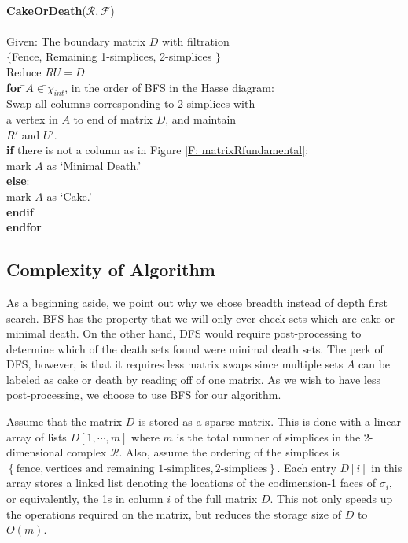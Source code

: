 \documentclass[10pt,twocolumn]{article} \usepackage{amsmath,epsf,amssymb,cite,pifont,amsthm, mathrsfs,epsfig,  bbm, amsthm,  setspace}
\newcommand{\RR}{\mathcal R}
\renewcommand{\1}{\mathbbm{1}}
\newcommand{\RF}{\mathcal{R},\mathcal{F}}
\begin{document}
\begin{tabbing}
\\
\textbf{CakeOrDeath}($\RF$)\\
\\
Given: \= The boundary matrix $D$ with filtration \\
\> $\{$Fence, Remaining 1-simplices, 2-simplices $\}$ \\
Reduce $RU=D$\\
\textbf{for} \=$A \in$\=$ \chi_{int}$,  in the order of BFS in the Hasse diagram:\\
\>	Swap all columns corresponding to 2-simplices with\\
\>\>		a vertex in $A$ to end of matrix $D$, and maintain\\
\>\>		$R'$ and $U'$.\\
\>	\textbf{if} there is not a column as in Figure \ref{F: matrixRfundamental}:\\
\>\>		mark $A$ as `Minimal Death.'\\
\>	\textbf{else}:\\
\>\>		mark $A$ as `Cake.'\\
\>	\textbf{endif}\\
\textbf{endfor}
\end{tabbing}


\subsection{Complexity of Algorithm} \label{S: Complexity of Algorithm}
As a beginning aside, we point out why we chose breadth instead of depth first search.
BFS has the property that we will only ever check sets which are cake or minimal death.
On the other hand, DFS would require post-processing to determine which of the death sets  found were minimal death sets.
The perk of DFS, however, is that it requires less matrix swaps since multiple sets $A$ can be labeled as cake or death by reading off of one matrix.
As we wish to have less post-processing, we choose to use BFS for our algorithm.

Assume that the matrix $D$ is stored as a sparse matrix.
This is done with a linear array of lists $D[1,\cdots,m]$ where $m$ is the total number of simplices
in the 2-dimensional complex $\RR$.
Also, assume the ordering of the simplices is
$\left\{ \textrm{fence}, \textrm{vertices and remaining 1-simplices}, \textrm{2-simplices} \right\}$.
Each entry $D[i]$ in this array stores a linked list denoting the locations of the codimension-1 faces of $\sigma_i$, or equivalently, the 1s in column $i$ of the full matrix $D$.  This not only speeds up the operations required on the matrix, but reduces the storage size of $D$ to $O(m)$.
\end{document}
